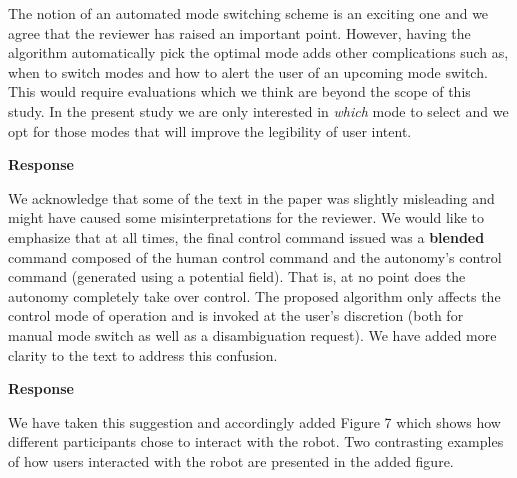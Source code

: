 \documentclass[a4paper,twoside,11pt]{reviewresponse}
\begin{document}
The notion of an automated mode switching scheme is an exciting one and we agree that the reviewer has raised an important point. However, having the algorithm automatically pick the optimal mode adds other complications such as, when to switch modes and how to alert the user of an upcoming mode switch. This would require evaluations which we think are beyond the scope of this study. In the present study we are only interested in \textit{which} mode to select and we opt for those modes that will improve the legibility of user intent. 


\textbf{Response}

We acknowledge that some of the text in the paper was slightly misleading and might have caused some misinterpretations for the reviewer. We would like to emphasize that at all times, the final control command issued was a \textbf{blended} command composed of the human control command and the autonomy's control command (generated using a potential field). That is, at no point does the autonomy completely take over control. The proposed algorithm only affects the control mode of operation and is invoked at the user's discretion (both for manual mode switch as well as a disambiguation request). We have added more clarity to the text to address this confusion. 


\textbf{Response}

We have taken this suggestion and accordingly added Figure 7 which shows how different participants chose to interact with the robot. Two contrasting examples of how users interacted with the robot are presented in the added figure. 

\end{document}
